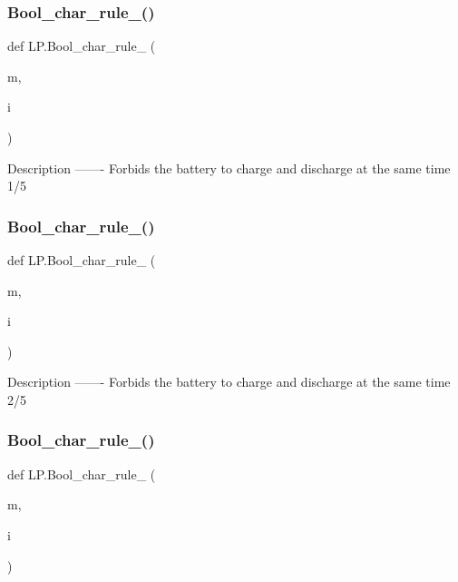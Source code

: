 \subsubsection{\texorpdfstring{Bool\+\_\+char\+\_\+rule\+\_()}{Bool\_char\_rule\_1()}}
{\footnotesize\ttfamily def L\+P.\+Bool\+\_\+char\+\_\+rule\+\_ (\begin{DoxyParamCaption}\item[{}]{m,  }\item[{}]{i }\end{DoxyParamCaption})}

\begin{DoxyVerb}Description
-------
Forbids the battery to charge and discharge at the same time 1/5
\end{DoxyVerb}
 \mbox{\label{namespace_l_p_aabc88e88fcb3e47650195e6e8aa72578}} 
\subsubsection{\texorpdfstring{Bool\+\_\+char\+\_\+rule\+\_()}{Bool\_char\_rule\_2()}}
{\footnotesize\ttfamily def L\+P.\+Bool\+\_\+char\+\_\+rule\+\_ (\begin{DoxyParamCaption}\item[{}]{m,  }\item[{}]{i }\end{DoxyParamCaption})}

\begin{DoxyVerb}Description
-------
Forbids the battery to charge and discharge at the same time 2/5
\end{DoxyVerb}
 \mbox{\label{namespace_l_p_a5e586c9382ca19f09272983cfec619a6}} 
\subsubsection{\texorpdfstring{Bool\+\_\+char\+\_\+rule\+\_()}{Bool\_char\_rule\_3()}}
{\footnotesize\ttfamily def L\+P.\+Bool\+\_\+char\+\_\+rule\+\_ (\begin{DoxyParamCaption}\item[{}]{m,  }\item[{}]{i }\end{DoxyParamCaption})}

